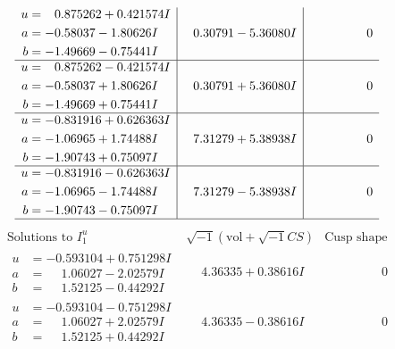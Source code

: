 \documentclass[1p]{elsarticle_modified}
\theoremstyle{definition}
\newcommand{\I}{\sqrt{-1}}
\begin{document}
$$\begin{array}{c|c|c}
\begin{aligned}
u &= \phantom{-}0.875262 + 0.421574 I \\
a &= -0.58037 - 1.80626 I \\
b &= -1.49669 - 0.75441 I\end{aligned}
 & \phantom{-}0.30791 - 5.36080 I & \phantom{-0.000000 } 0 \\ \hline\begin{aligned}
u &= \phantom{-}0.875262 - 0.421574 I \\
a &= -0.58037 + 1.80626 I \\
b &= -1.49669 + 0.75441 I\end{aligned}
 & \phantom{-}0.30791 + 5.36080 I & \phantom{-0.000000 } 0 \\ \hline\begin{aligned}
u &= -0.831916 + 0.626363 I \\
a &= -1.06965 + 1.74488 I \\
b &= -1.90743 + 0.75097 I\end{aligned}
 & \phantom{-}7.31279 + 5.38938 I & \phantom{-0.000000 } 0 \\ \hline\begin{aligned}
u &= -0.831916 - 0.626363 I \\
a &= -1.06965 - 1.74488 I \\
b &= -1.90743 - 0.75097 I\end{aligned}
 & \phantom{-}7.31279 - 5.38938 I & \phantom{-0.000000 } 0\\
 \hline 
 \end{array}$$\newpage$$\begin{array}{c|c|c}  
\text{Solutions to }I^u_{1}& \I (\text{vol} + \sqrt{-1}CS) & \text{Cusp shape}\\
 \hline 
\begin{aligned}
u &= -0.593104 + 0.751298 I \\
a &= \phantom{-}1.06027 - 2.02579 I \\
b &= \phantom{-}1.52125 - 0.44292 I\end{aligned}
 & \phantom{-}4.36335 + 0.38616 I & \phantom{-0.000000 } 0 \\ \hline\begin{aligned}
u &= -0.593104 - 0.751298 I \\
a &= \phantom{-}1.06027 + 2.02579 I \\
b &= \phantom{-}1.52125 + 0.44292 I\end{aligned}
 & \phantom{-}4.36335 - 0.38616 I & \phantom{-0.000000 } 0 \\ \hline\begin{aligned}

\end{aligned}
\end{array}$$
\end{document}
